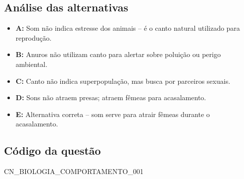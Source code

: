 \documentclass{article}
\begin{document}
\subsection*{Análise das alternativas}
\begin{itemize}
  \item \textbf{A:} Som não indica estresse dos animais – é o canto natural utilizado para reprodução.
  \item \textbf{B:} Anuros não utilizam canto para alertar sobre poluição ou perigo ambiental.
  \item \textbf{C:} Canto não indica superpopulação, mas busca por parceiros sexuais.
  \item \textbf{D:} Sons não atraem presas; atraem fêmeas para acasalamento.
  \item \textbf{E:} Alternativa correta – som serve para atrair fêmeas durante o acasalamento.
\end{itemize}

\subsection*{Código da questão}
CN\_BIOLOGIA\_COMPORTAMENTO\_001
\end{document}
